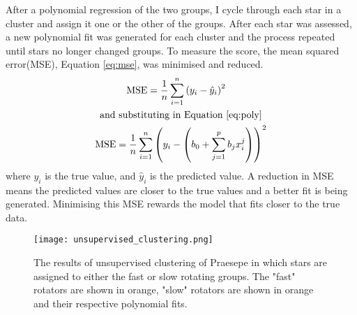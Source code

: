 \documentclass[fleqn,usenatbib]{mnras}
\begin{document}
After a polynomial regression of the two groups, I cycle through each star in a cluster and assign it one or the other of the groups.
After each star was assessed, a new polynomial fit was generated for each cluster and the process repeated until stars no longer changed groups.
To measure the score, the mean squared error(MSE), Equation \ref{eq:mse}, was minimised and reduced.
\begin{gather}
	\begin{aligned}
		\label{eq:mse}
		\textup{MSE} &= \frac{1}{n}\sum_{i=1}^n \left(y_i - \hat{y}_i\right)^2
	\end{aligned}
	\\
	\begin{aligned}
		\textup{and substituting in Equation \ref{eq:poly}}\nonumber
	\end{aligned}
	\\
	\begin{aligned}
		\textup{MSE} = \frac{1}{n}\sum_{i = 1}^n \left(y_i - \left(b_0 + \sum_{j = 1}^p b_jx_i^j\right) \right)^2
	\end{aligned}
\end{gather}
where $y_i$ is the true value, and $\hat{y}_i$ is the predicted value.
A reduction in MSE means the predicted values are closer to the true values and a better fit is being generated.
Minimising this MSE rewards the model that fits closer to the true data.

\begin{figure}
	\texttt{[image: unsupervised\_clustering.png]}
	\caption{The results of unsupervised clustering of Praesepe in which stars are assigned to either the fast or slow rotating groups. The "fast" rotators are shown in orange, "slow" rotators are shown in orange and their respective polynomial fits.}
	\label{fig:unsupervised_clustering}
\end{figure}
\end{document}
